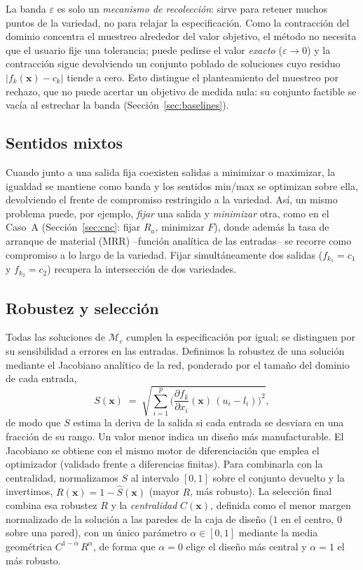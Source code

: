 \documentclass[5p,times,authoryear]{elsarticle}
\begin{document}
La banda $\varepsilon$ es solo un \emph{mecanismo de recolección}: sirve para
retener muchos puntos de la variedad, no para relajar la especificación. Como la
contracción del dominio concentra el muestreo alrededor del valor objetivo, el
método no necesita que el usuario fije una tolerancia; puede pedirse el valor
\emph{exacto} ($\varepsilon\to0$) y la contracción sigue devolviendo un conjunto
poblado de soluciones cuyo residuo $|f_k(\mathbf{x})-c_k|$ tiende a cero. Esto
distingue el planteamiento del muestreo por rechazo, que no puede acertar un
objetivo de medida nula: su conjunto factible se vacía al estrechar la banda
(Sección~\ref{sec:baselines}).

\subsection{Sentidos mixtos}
Cuando junto a una salida fija coexisten salidas a minimizar o maximizar, la
igualdad se mantiene como banda y los sentidos min/max se optimizan sobre ella,
devolviendo el frente de compromiso restringido a la variedad. Así, un mismo
problema puede, por ejemplo, \emph{fijar} una salida y \emph{minimizar} otra, como en el
Caso~A (Sección~\ref{sec:cnc}: fijar $R_a$, minimizar $F$), donde además la tasa de
arranque de material (MRR) --función analítica de las entradas-- se recorre como
compromiso a lo largo de la variedad. Fijar simultáneamente dos salidas
($f_{k_1}=c_1$ y $f_{k_2}=c_2$) recupera la intersección de dos variedades.

\subsection{Robustez y selección}
\label{sec:robustez}
Todas las soluciones de $\mathcal{M}_c$ cumplen la especificación por igual; se
distinguen por su sensibilidad a errores en las entradas. Definimos la robustez
de una solución mediante el Jacobiano analítico de la red, ponderado por el
tamaño del dominio de cada entrada,
\begin{equation}
S(\mathbf{x}) \;=\;
\sqrt{\sum_{i=1}^{p}\Big(\frac{\partial f_k}{\partial x_i}(\mathbf{x})\,
(u_i-l_i)\Big)^{2}} ,
\label{eq:sens}
\end{equation}
de modo que $S$ estima la deriva de la salida si cada entrada se desviara en una
fracción de su rango. Un valor menor indica un diseño más manufacturable. El
Jacobiano se obtiene con el mismo motor de diferenciación que emplea el
optimizador (validado frente a diferencias finitas). Para combinarla con la
centralidad, normalizamos $S$ al intervalo $[0,1]$ sobre el conjunto devuelto y la
invertimos, $R(\mathbf{x})=1-\hat S(\mathbf{x})$ (mayor $R$, más robusto). La
selección final combina esa robustez $R$ y la \emph{centralidad} $C(\mathbf{x})$,
definida como el menor margen normalizado de la solución a las paredes de la caja de
diseño ($1$ en el centro, $0$ sobre una pared), con un único parámetro
$\alpha\in[0,1]$ mediante la media geométrica $C^{1-\alpha}\,R^{\alpha}$, de forma
que $\alpha=0$ elige el diseño más central y $\alpha=1$ el más robusto.
\end{document}
